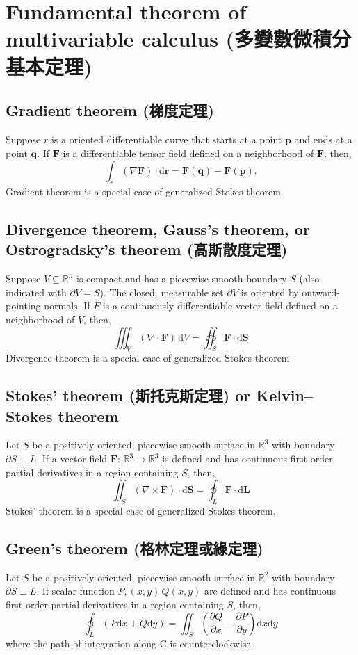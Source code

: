 \documentclass[a4paper,12pt]{report}
\begin{document}
\section{Fundamental theorem of multivariable calculus (多變數微積分基本定理)}
\subsection{Gradient theorem (梯度定理)}
Suppose $r$ is a oriented differentiable curve that starts at a point $\mathbf{p}$ and ends at a point $\mathbf{q}$. If $\mathbf{F}$ is a differentiable tensor field defined on a neighborhood of $\mathbf{F}$, then,
\[\int_r(\nabla\mathbf{F})\cdot\mathrm{d}\mathbf{r}=\mathbf{F}\left(\mathbf{q}\right)-\mathbf{F}\left(\mathbf{p}\right).\]
Gradient theorem is a special case of generalized Stokes theorem.
\subsection{Divergence theorem, Gauss's theorem, or Ostrogradsky's theorem (高斯散度定理)}
Suppose $V\subseteq\mathbb{R}^n$ is compact and has a piecewise smooth boundary $S$ (also indicated with $\partial V=S$). The closed, measurable set $\partial V$ is oriented by outward-pointing normals. If $F$ is a continuously differentiable vector field defined on a neighborhood of $V$, then,
\[\iiint_V\left(\nabla\cdot\mathbf {F}\right)\,\mathrm{d}V=\oiint_S\mathbf{F}\cdot\mathrm{d}\mathbf{S}\]
Divergence theorem is a special case of generalized Stokes theorem.
\subsection{Stokes' theorem (斯托克斯定理) or Kelvin–Stokes theorem}
Let $S$ be a positively oriented, piecewise smooth surface in $\mathbb{R}^3$ with boundary $\partial S\equiv L$. If a vector field $\mathbf{F}:\,\mathbb{R}^3\rightarrow\mathbb{R}^3$ is defined and has continuous first order partial derivatives in a region containing $S$, then,
\[\iint_S(\nabla\times\mathbf{F})\cdot \mathrm{d}\mathbf{S}=\oint_{L}\mathbf{F}\cdot\mathrm{d}\mathbf{L}\]
Stokes' theorem is a special case of generalized Stokes theorem.
\subsection{Green's theorem (格林定理或綠定理)}
Let $S$ be a positively oriented, piecewise smooth surface in $\mathbb{R}^2$ with boundary $\partial S\equiv L$. If scalar function $P,(x,y)\,Q(x,y)$ are defined and has continuous first order partial derivatives in a region containing $S$, then,
\[\oint_L (P\mathrm{d}x+Q\mathrm{d}y)=\iint_S\left(\frac{\partial Q}{\partial x}-\frac{\partial P}{\partial y}\right)\mathrm{d}x\mathrm{d}y\]
where the path of integration along C is counterclockwise.
\end{document}
